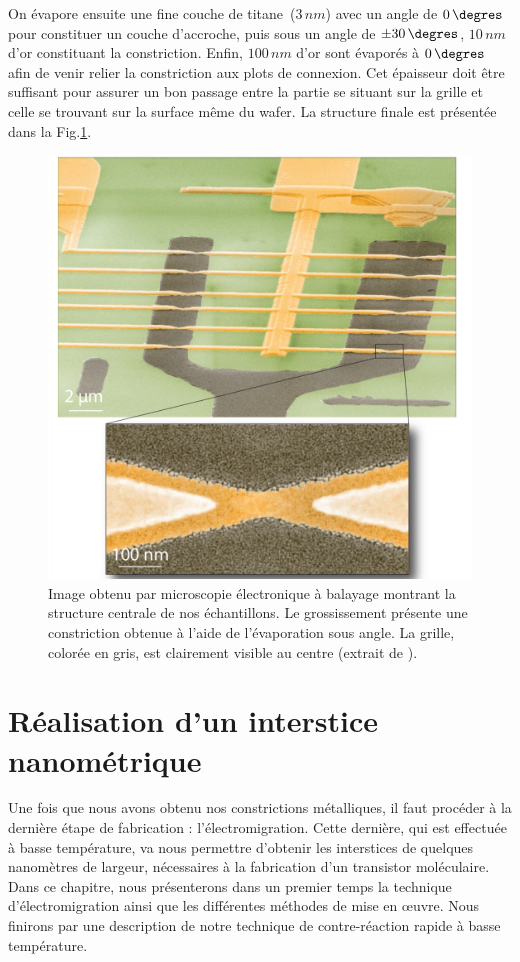 On évapore ensuite une fine couche de titane~(3$\, nm$) avec un angle de $0\,\degres$ pour constituer un couche d'accroche, puis sous un angle de $\pm30\,\degres$, $10\, nm$ d'or  constituant la constriction. Enfin, $100\,nm$ d'or sont évaporés à $0\,\degres$ afin de venir relier la constriction aux plots de connexion. Cet épaisseur doit être suffisant pour assurer un bon passage entre la partie se situant sur la grille et celle se trouvant sur la surface même du wafer. La structure finale est présentée dans la Fig.\ref{ZoomFinal}.

\begin{figure}
\centering \includegraphics[scale=0.45]{Fabrication/ZoomFinal/ZoomFinal.pdf}
\caption{Image obtenu par microscopie électronique à balayage montrant la structure centrale de nos échantillons. Le grossissement présente une constriction obtenue à l'aide de l'évaporation sous angle. La grille, colorée en gris, est clairement visible au centre (extrait de \cite{RochPhD}).}
\label{ZoomFinal}
\end{figure}


\section{Réalisation d'un interstice nanométrique}
Une fois que nous avons obtenu nos constrictions métalliques, il faut procéder à la dernière étape de fabrication : l'électromigration. Cette dernière, qui est effectuée à basse température, va nous permettre d'obtenir les interstices de quelques nanomètres de largeur, nécessaires à la fabrication d'un transistor moléculaire. Dans ce chapitre, nous présenterons dans un premier temps la technique d'électromigration ainsi que les différentes méthodes de mise en œuvre. Nous finirons par une description de notre technique de contre-réaction rapide à basse température.

